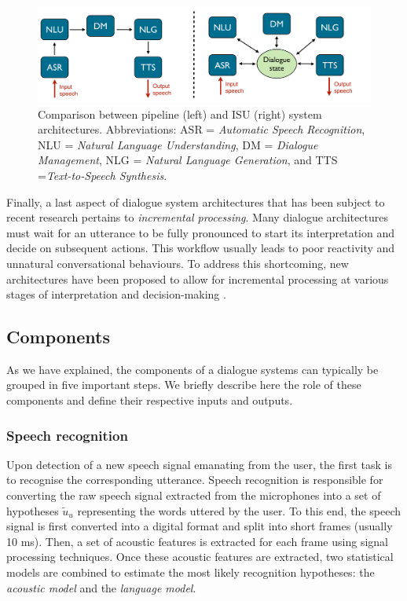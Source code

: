  \begin{figure}[h!]
\centering
\includegraphics[scale=0.28]{imgs/architecture_comparison.pdf}
\caption{Comparison between pipeline (left) and ISU (right) system architectures.  Abbreviations: ASR = \textit{Automatic Speech Recognition}, NLU = \textit{Natural Language Understanding}, DM = \textit{Dialogue Management}, NLG = \textit{Natural Language Generation}, and TTS =\textit{Text-to-Speech Synthesis}.}
\label{fig:architecture_comp}
\end{figure}

Finally, a last aspect of dialogue system architectures that has been subject to recent research pertains to \textit{incremental processing}.  Many dialogue architectures must wait for an utterance to be fully pronounced to start its interpretation and decide on subsequent actions.  This workflow usually leads to poor reactivity and unnatural conversational behaviours.  To address this shortcoming, new architectures have been proposed to allow for incremental processing at various stages of interpretation and decision-making \citep{schlangen2009general}.


\subsection{Components}

As we have explained, the components of a dialogue systems can typically be grouped in five important steps.  We briefly describe here the role of these components and define their respective inputs and outputs.

\subsubsection*{Speech recognition}
Upon detection of a new speech signal emanating from the user, the first task is to recognise the corresponding utterance. Speech recognition is responsible for converting the raw speech signal extracted from the microphones into a set of hypotheses $\tilde{u}_u$ representing the words uttered by the user. To this end, the speech signal is first converted into a digital format and split into short frames (usually 10 ms). Then, a set of acoustic features is extracted for each frame using signal processing techniques.  Once these acoustic features are extracted, two statistical models are combined to estimate the most likely recognition hypotheses: the \textit{acoustic model} and the \textit{language model}.  

